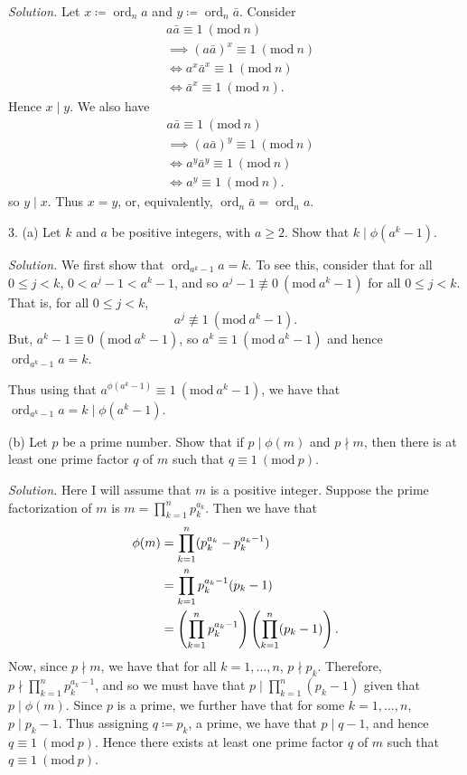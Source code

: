 \documentclass{article}
\newcommand{\Mod}[1]{\ (\mathrm{mod}\ #1)}
\DeclareMathOperator{\ord}{ord}
\begin{document}
\textit{Solution.}
Let $x \coloneqq \ord_n a$ and $y \coloneqq \ord_n \bar{a}$. Consider
%
\begin{align*}
    &a \bar{a} \equiv 1 \Mod{n} \\
    &\implies (a \bar{a})^x \equiv 1 \Mod{n} \\
    &\iff a^x \bar{a}^x \equiv 1 \Mod{n} \\
    &\iff \bar{a}^x \equiv 1 \Mod{n}.
\end{align*}
%
Hence $x \mid y$. We also have
%
\begin{align*}
    &a \bar{a} \equiv 1 \Mod{n} \\
    &\implies (a \bar{a})^y \equiv 1 \Mod{n} \\
    &\iff a^y \bar{a}^y \equiv 1 \Mod{n} \\
    &\iff a^y \equiv 1 \Mod{n}.
\end{align*}
%
so $y \mid x$. Thus $x = y$, or, equivalently, $\ord_n \bar{a} = \ord_n a$.

\newpage

3. (a) Let $k$ and $a$ be positive integers, with $a \geq 2$. Show
that $k \mid \phi(a^k - 1)$.

\textit{Solution.}
We first show that $\ord_{a^k - 1} a = k$. To see this, consider that
for all $0 \leq j < k$, $0 < a^j - 1 < a^k - 1$, and so
$a^j - 1 \not\equiv 0 \Mod{a^k - 1}$ for all $0 \leq j < k$.
That is, for all $0 \leq j < k$,
%
\begin{equation*}
    a^j \not\equiv 1 \Mod{a^k - 1}
    .
\end{equation*}
%
But, $a^k - 1 \equiv 0 \Mod{a^k - 1}$, so $a^k \equiv 1 \Mod{a^k - 1}$
and hence $\ord_{a^k - 1} a = k$.

Thus using that $a^{\phi(a^k - 1)} \equiv 1 \Mod{a^k - 1}$, we have that
$\ord_{a^k - 1} a = k \mid \phi(a^k - 1)$.

\vspace{5mm}

(b) Let $p$ be a prime number. Show that if $p \mid \phi(m)$ and
$p \nmid m$, then there is at least one prime factor $q$ of $m$
such that $q \equiv 1 \Mod{p}$.

\textit{Solution.}
Here I will assume that $m$ is a positive integer. Suppose the prime
factorization of $m$ is $m = \prod_{k = 1}^n p_k^{a_k}$. Then we have
that
%
\begin{align*}
    \phi(m)
    &= \prod_{k = 1}^n (p_k^{a_k} - p_k^{a_k - 1}) \\
    &= \prod_{k = 1}^n p_k^{a_k - 1} (p_k - 1) \\
    &= \del[4]{\prod_{k = 1}^n p_k^{a_k - 1}} \del[4]{\prod_{k = 1}^n (p_k - 1)}
    .
\end{align*}
%
Now, since $p \nmid m$, we have that for all $k = 1, \ldots, n$, $p \nmid p_k$.
Therefore, $p \nmid \prod_{k = 1}^n p_k^{a_k - 1}$, and so we must have that
$p \mid \prod_{k = 1}^n (p_k - 1)$ given that $p \mid \phi(m)$. Since $p$
is a prime, we further have that for some $k = 1, \ldots, n$, $p \mid p_k - 1$.
Thus assigning $q \coloneqq p_k$, a prime, we have that $p \mid q - 1$, and hence
$q \equiv 1 \Mod{p}$. Hence there exists at least one prime factor $q$ of $m$
such that $q \equiv 1 \Mod{p}$.
\end{document}
